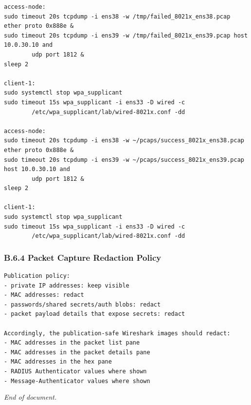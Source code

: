 \documentclass[11pt]{article}
\begin{document}
\begin{verbatim}
access-node:
sudo timeout 20s tcpdump -i ens38 -w /tmp/failed_8021x_ens38.pcap ether proto 0x888e &
sudo timeout 20s tcpdump -i ens39 -w /tmp/failed_8021x_ens39.pcap host 10.0.30.10 and 
        udp port 1812 &
sleep 2

client-1:
sudo systemctl stop wpa_supplicant
sudo timeout 15s wpa_supplicant -i ens33 -D wired -c 
        /etc/wpa_supplicant/lab/wired-8021x.conf -dd

access-node:
sudo timeout 20s tcpdump -i ens38 -w ~/pcaps/success_8021x_ens38.pcap ether proto 0x888e &
sudo timeout 20s tcpdump -i ens39 -w ~/pcaps/success_8021x_ens39.pcap host 10.0.30.10 and
        udp port 1812 &
sleep 2

client-1:
sudo systemctl stop wpa_supplicant
sudo timeout 15s wpa_supplicant -i ens33 -D wired -c 
        /etc/wpa_supplicant/lab/wired-8021x.conf -dd
\end{verbatim}


\subsubsection{B.6.4 Packet Capture Redaction Policy}
\label{sec:appendix-b-packet-capture-redaction-policy}

\begin{verbatim}
Publication policy:
- private IP addresses: keep visible
- MAC addresses: redact
- passwords/shared secrets/auth blobs: redact
- packet payload details that expose secrets: redact

Accordingly, the publication-safe Wireshark images should redact:
- MAC addresses in the packet list pane
- MAC addresses in the packet details pane
- MAC addresses in the hex pane
- RADIUS Authenticator values where shown
- Message-Authenticator values where shown
\end{verbatim}

\bigskip

\noindent\textit{End of document.}
\end{document}
